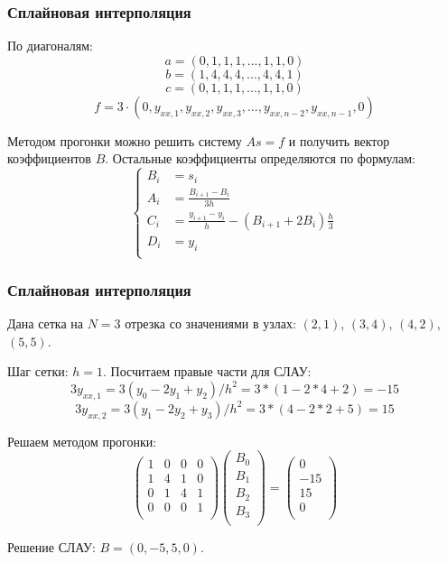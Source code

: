 \documentclass[10pt]{beamer}
\begin{document}
\begin{frame}[fragile]
\frametitle{Сплайновая интерполяция}
По диагоналям:
$$ a = (0, 1, 1, 1, ..., 1, 1, 0) $$
$$ b = (1, 4, 4, 4, ..., 4, 4, 1) $$
$$ c = (0, 1, 1, 1, ..., 1, 1, 0) $$
$$ f = 3 \cdot (0, {y}_{xx, 1}, {y}_{xx, 2}, {y}_{xx, 3}, ..., {y}_{xx, n-2}, {y}_{xx, n-1}, 0) $$

Методом прогонки можно решить систему $A s = f$ и получить вектор коэффициентов $B$. Остальные коэффициенты определяются по формулам:
$$
\begin{cases}
B_i &= s_i \\
A_i &= \frac{B_{i+1} - B_i}{3 h}\\
C_i &= \frac{y_{i+1} - y_i}{h} - \left(B_{i+1} + 2 B_{i}\right) \frac{h}{3}\\
D_i &= y_i\\
\end{cases}
$$
\end{frame}

\begin{frame}[fragile]
\frametitle{Сплайновая интерполяция}

Дана сетка на $N=3$ отрезка со значениями в узлах: $(2, 1)$, $(3, 4)$, $(4, 2)$, $(5, 5)$.

Шаг сетки: $h = 1$. Посчитаем правые части для СЛАУ:
$$3 y_{xx, 1} = 3 (y_{0} - 2 y_{1} + y_{2}) /{h^2} = 3 * (1 - 2 * 4 + 2)  = - 15$$
$$3 y_{xx, 2} = 3 (y_{1} - 2 y_{2} + y_{3}) /{h^2} = 3 * (4 - 2 * 2 + 5)  = 15$$

Решаем методом прогонки:
$$
\begin{pmatrix}
  1 & 0 & 0 & 0 \\
  1 & 4 & 1 & 0 \\
  0 & 1 & 4 & 1 \\
  0 & 0 & 0 & 1 \\
\end{pmatrix}
\begin{pmatrix}
B_0\\
B_1\\
B_2\\
B_3\\
\end{pmatrix}
=
\begin{pmatrix}
0\\
-15 \\
15 \\
0 \\
\end{pmatrix}
$$

Решение СЛАУ: $B = (0, -5, 5, 0)$. 

\end{frame}
\end{document}
